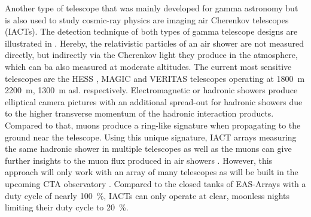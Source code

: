 Another type of telescope that was mainly developed for gamma astronomy but is also used to study cosmic-ray physics are imaging air Cherenkov telescopes (IACTs).
The detection technique of both types of gamma telescope designs are illustrated in .
Hereby, the relativistic particles of an air shower are not measured directly, but indirectly via the Cherenkov light they produce in the atmosphere, which can ba also measured at moderate altitudes.
The current most sensitive telescopes are the HESS \cite{HESS20}, MAGIC \cite{MAGIC16II} and VERITAS \cite{VERITAS15Science} telescopes operating at \SI{1800}{m} \SI{2200}{m}, \SI{1300}{m} asl. respectively.
Electromagnetic or hadronic showers produce elliptical camera pictures with an additional spread-out for hadronic showers due to the higher transverse momentum of the hadronic interaction products.
Compared to that, muons produce a ring-like signature when propagating to the ground near the telescope.
Using this unique signature, IACT arrays measuring the same hadronic shower in multiple telescopes as well as the muons can give further insights to the muon flux produced in air showers \cite{Mitchell19MuonIACT}.
However, this approach will only work with an array of many telescopes as will be built in the upcoming CTA observatory \cite{CTA19Science}.
Compared to the closed tanks of EAS-Arrays with a duty cycle of nearly \SI{100}{\%}, IACTs can only operate at clear, moonless nights limiting their duty cycle to \SI{20}{\%}.
